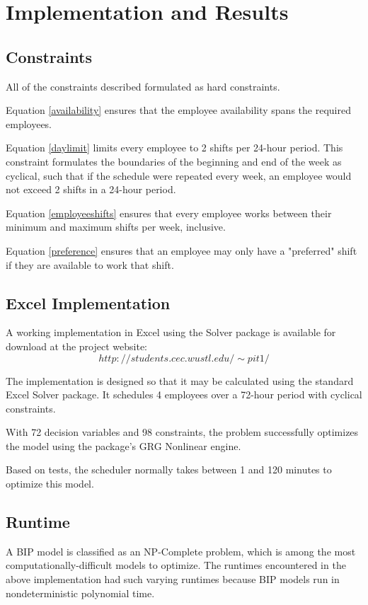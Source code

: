 \chapter{Implementation and Results}


\section{Constraints}
All of the constraints described formulated as hard constraints. 

Equation \eqref{availability} ensures that the employee availability spans the required employees.

Equation \eqref{daylimit} limits every employee to 2 shifts per 24-hour period. This constraint formulates the boundaries of the beginning and end of the week as cyclical, such that if the schedule were repeated every week, an employee would not exceed 2 shifts in a 24-hour period. 

Equation \eqref{employeeshifts} ensures that every employee works between their minimum and maximum shifts per week, inclusive.

Equation \eqref{preference} ensures that an employee may only have a "preferred" shift if they are available to work that shift. 

\section{Excel Implementation}
A working implementation in Excel using the Solver package is available for download at the project website:
$$http://students.cec.wustl.edu/\sim pit1/$$

The implementation is designed so that it may be calculated using the standard Excel Solver package. It schedules 4 employees over a 72-hour period with cyclical constraints. 

With 72 decision variables and 98 constraints, the problem successfully optimizes the model using the package's GRG Nonlinear engine. 

Based on tests, the scheduler normally takes between 1 and 120 minutes to optimize this model. 

\section{Runtime}

A BIP model is classified as an NP-Complete problem, which is among the most computationally-difficult models to optimize. The runtimes encountered in the above implementation had such varying runtimes because BIP models run in nondeterministic polynomial time. 

